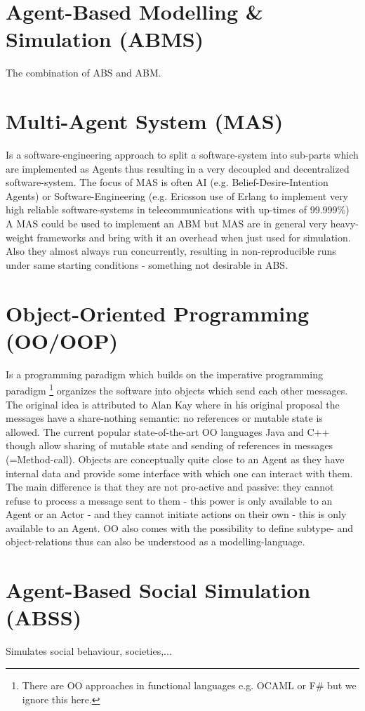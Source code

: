 \documentclass[oneside]{book}
\begin{document}
\section*{Agent-Based Modelling \& Simulation (ABMS)}
The combination of ABS and ABM.

\section*{Multi-Agent System (MAS)}
Is a software-engineering approach to split a software-system into sub-parts which are implemented as Agents thus resulting in a very decoupled and decentralized software-system. The focus of MAS is often AI (e.g. Belief-Desire-Intention Agents) or Software-Engineering (e.g. Ericsson use of Erlang to implement very high reliable software-systems in telecommunications with up-times of 99.999\%)
A MAS could be used to implement an ABM but MAS are in general very heavy-weight frameworks and bring with it an overhead when just used for simulation. Also they almost always run concurrently, resulting in non-reproducible runs under same starting conditions - something not desirable in ABS.

\section*{Object-Oriented Programming (OO/OOP)}
Is a programming paradigm which builds on the imperative programming paradigm \footnote{There are OO approaches in functional languages e.g. OCAML or F\# but we ignore this here.} organizes the software into objects which send each other messages. The original idea is attributed to Alan Kay where in his original proposal the messages have a share-nothing semantic: no references or mutable state is allowed.
The current popular state-of-the-art OO languages Java and C++ though allow sharing of mutable state and sending of references in messages (=Method-call).
Objects are conceptually quite close to an Agent as they have internal data and provide some interface with which one can interact with them. The main difference is that they are not pro-active and passive: they cannot refuse to process a message sent to them - this power is only available to an Agent or an Actor - and they cannot initiate actions on their own - this is only available to an Agent.
OO also comes with the possibility to define subtype- and object-relations thus can also be understood as a modelling-language.

\section*{Agent-Based Social Simulation (ABSS)}
Simulates social behaviour, societies,...
\end{document}
